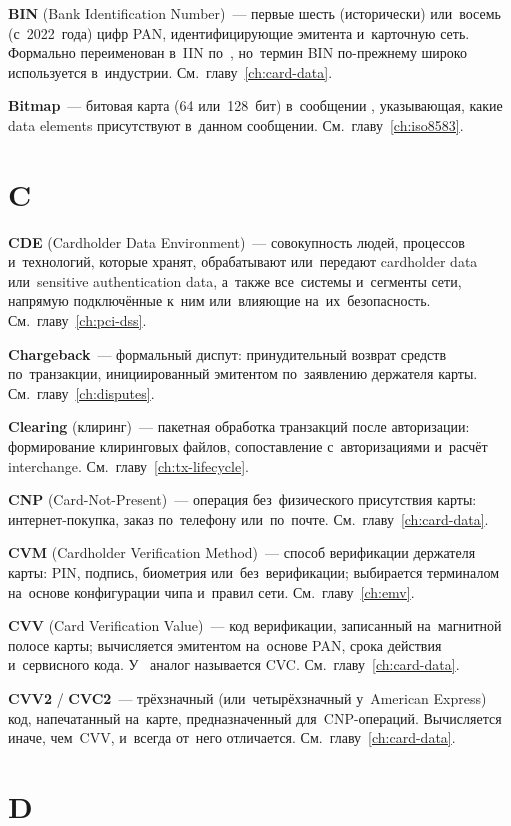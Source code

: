\textbf{BIN} (Bank Identification Number)~--- первые шесть
(исторически) или~восемь (с~2022~года) цифр PAN,
идентифицирующие эмитента и~карточную сеть. Формально
переименован в~IIN по~, но~термин BIN по-прежнему
широко используется в~индустрии. См.~главу~\ref{ch:card-data}.

\textbf{Bitmap}~--- битовая карта (64 или~128~бит) в~сообщении
, указывающая, какие data elements присутствуют
в~данном сообщении. См.~главу~\ref{ch:iso8583}.


\section*{C}

\textbf{CDE} (Cardholder Data Environment)~--- совокупность
людей, процессов и~технологий, которые хранят, обрабатывают
или~передают cardholder data или~sensitive authentication data,
а~также все~системы и~сегменты сети, напрямую подключённые к~ним
или~влияющие на~их~безопасность. См.~главу~\ref{ch:pci-dss}.

\textbf{Chargeback}~--- формальный диспут: принудительный возврат
средств по~транзакции, инициированный эмитентом по~заявлению
держателя карты. См.~главу~\ref{ch:disputes}.

\textbf{Clearing} (клиринг)~--- пакетная обработка транзакций
после авторизации: формирование клиринговых файлов,
сопоставление с~авторизациями и~расчёт
interchange. См.~главу~\ref{ch:tx-lifecycle}.

\textbf{CNP} (Card-Not-Present)~--- операция без~физического
присутствия карты: интернет-покупка, заказ по~телефону
или~по~почте. См.~главу~\ref{ch:card-data}.

\textbf{CVM} (Cardholder Verification Method)~--- способ
верификации держателя карты: PIN, подпись, биометрия
или~без~верификации; выбирается терминалом на~основе конфигурации
чипа и~правил сети. См.~главу~\ref{ch:emv}.

\textbf{CVV} (Card Verification Value)~--- код верификации,
записанный на~магнитной полосе карты; вычисляется эмитентом
на~основе PAN, срока действия и~сервисного кода.
У~ аналог называется
CVC. См.~главу~\ref{ch:card-data}.

\textbf{CVV2} / \textbf{CVC2}~--- трёхзначный (или~четырёхзначный
у~American Express) код, напечатанный на~карте, предназначенный
для~CNP-операций. Вычисляется иначе, чем~CVV, и~всегда
от~него отличается. См.~главу~\ref{ch:card-data}.


\section*{D}

